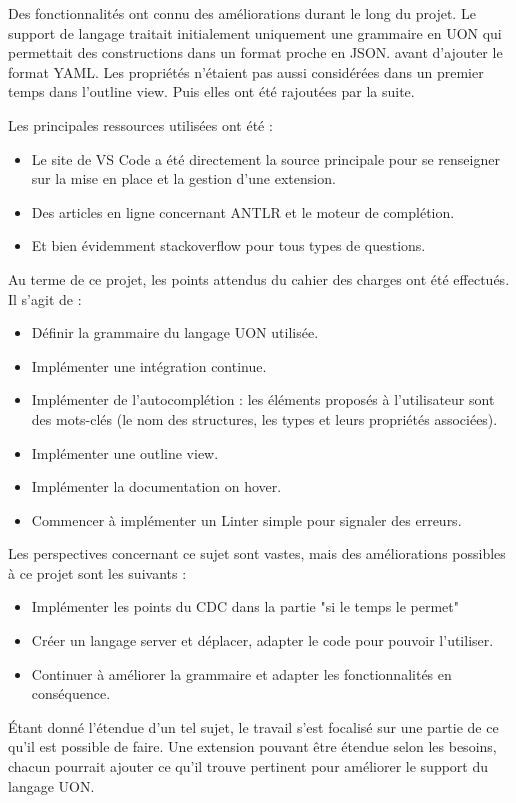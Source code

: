 Des fonctionnalités ont connu des améliorations durant le long du projet.
Le support de langage traitait initialement uniquement une grammaire en UON qui permettait des constructions dans un format proche en JSON.
avant d'ajouter le format YAML.
Les propriétés n'étaient pas aussi considérées dans un premier temps dans l'outline view. Puis elles ont été rajoutées par la suite.

Les principales ressources utilisées ont été :

\begin{itemize}
    \item Le site de VS Code a été directement la source principale pour se renseigner sur la mise en place et la gestion d'une extension.
    \item Des articles en ligne concernant ANTLR et le moteur de complétion.
    \item Et bien évidemment stackoverflow pour tous types de questions.
\end{itemize}




Au terme de ce projet, les points attendus du cahier des charges ont été effectués. Il s'agit de :
\begin{itemize}
    \item Définir la grammaire du langage UON utilisée.
    \item Implémenter une intégration continue.
    \item Implémenter de l'autocomplétion : les éléments proposés à l'utilisateur sont des mots-clés (le nom des structures, les types et leurs propriétés associées).
    \item Implémenter une outline view.
    \item Implémenter la documentation on hover.
    \item Commencer à implémenter un Linter simple pour signaler des erreurs.
\end{itemize}

Les perspectives concernant ce sujet sont vastes, mais des améliorations possibles à ce projet sont les suivants :
\begin{itemize}
    \item Implémenter les points du CDC dans la partie "si le temps le permet"
    \item Créer un langage server et déplacer, adapter le code pour pouvoir l'utiliser.
    \item Continuer à améliorer la grammaire et adapter les fonctionnalités en conséquence.
\end{itemize}

Étant donné l'étendue d'un tel sujet, le travail s'est focalisé sur une partie de ce qu'il est possible de faire.
Une extension pouvant être étendue selon les besoins, chacun pourrait ajouter ce qu'il trouve pertinent pour améliorer le support du langage UON.

